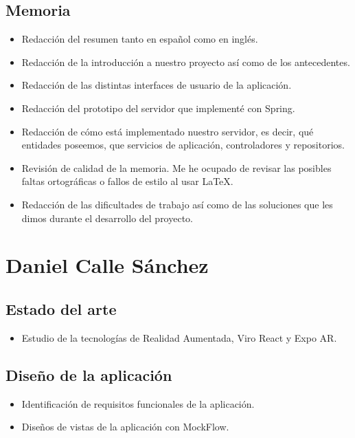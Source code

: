     \subsection{Memoria}
    \label{makereference7.1.3}
        \begin{itemize}
            \item Redacción del resumen tanto en español como en inglés.
            \item Redacción de la introducción a nuestro proyecto así como de los antecedentes.
            \item Redacción de las distintas interfaces de usuario de la aplicación.
            \item Redacción del prototipo del servidor que implementé con Spring.
            \item Redacción de cómo está implementado nuestro servidor, es decir, qué entidades poseemos, que servicios de aplicación, controladores y repositorios.
            \item Revisión de calidad de la memoria. Me he ocupado de revisar las posibles faltas ortográficas o fallos de estilo al usar LaTeX.
            \item Redacción de las dificultades de trabajo así como de las soluciones que les dimos durante el desarrollo del proyecto.
        \end{itemize}

\section{Daniel Calle Sánchez}
\label{makereference7.2}
    \subsection{Estado del arte}
    \label{makereference7.2.1}
        \begin{itemize}
            \item Estudio de la tecnologías de Realidad Aumentada, Viro React y
            Expo AR.
        \end{itemize}
    \subsection{Diseño de la aplicación}
    \label{makereference7.2.2}
        \begin{itemize}
            \item Identificación de requisitos funcionales de la aplicación.
            \item Diseños de vistas de la aplicación con MockFlow.
        \end{itemize}
